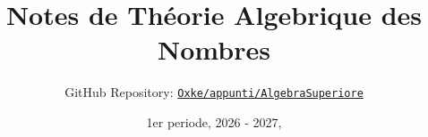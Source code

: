 

\title{Notes de Théorie Algebrique des Nombres}
\author{GitHub Repository:
\href{https://github.com/Oxke/appunti/tree/main/AlgebraSuperiore}{\texttt{Oxke/appunti/AlgebraSuperiore}}}

\date{1er periode, 2026 \-- 2027,}


\maketitle
\tableofcontents






